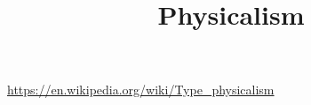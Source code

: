 \documentclass[a4paper]{article}
\title{Physicalism}
\date{}
\begin{document}
    \maketitle
        
    \url{https://en.wikipedia.org/wiki/Type_physicalism}
\end{document}
